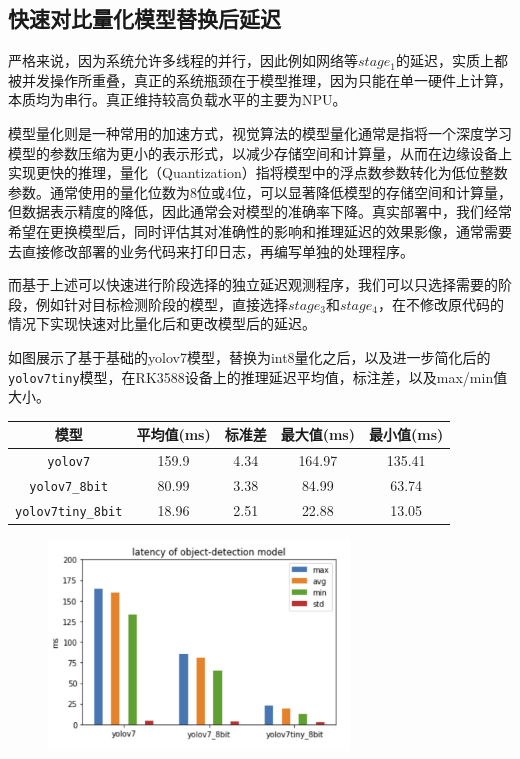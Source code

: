 \documentclass[master,anonymous]{shtthesis}
\begin{document}
\subsection{快速对比量化模型替换后延迟}
严格来说，因为系统允许多线程的并行，因此例如网络等$stage_1$的延迟，实质上都被并发操作所重叠，真正的系统瓶颈在于模型推理，因为只能在单一硬件上计算，本质均为串行。真正维持较高负载水平的主要为NPU。

模型量化则是一种常用的加速方式，视觉算法的模型量化通常是指将一个深度学习模型的参数压缩为更小的表示形式，以减少存储空间和计算量，从而在边缘设备上实现更快的推理，量化（Quantization）指将模型中的浮点数参数转化为低位整数参数。通常使用的量化位数为8位或4位，可以显著降低模型的存储空间和计算量，但数据表示精度的降低，因此通常会对模型的准确率下降。真实部署中，我们经常希望在更换模型后，同时评估其对准确性的影响和推理延迟的效果影像，通常需要去直接修改部署的业务代码来打印日志，再编写单独的处理程序。

而基于上述可以快速进行阶段选择的独立延迟观测程序，我们可以只选择需要的阶段，例如针对目标检测阶段的模型，直接选择$stage_3$和$stage_4$，在不修改原代码的情况下实现快速对比量化后和更改模型后的延迟。

如图展示了基于基础的yolov7模型，替换为int8量化之后，以及进一步简化后的\verb*|yolov7tiny|模型，在RK3588设备上的推理延迟平均值，标注差，以及max/min值大小。

\begin{table}[htbp]
	\centering
	\begin{tabular}{ccccc}
		\toprule
		模型  & 平均值(ms) & 标准差 & 最大值(ms) & 最小值(ms)\\
		\midrule
		\verb*|yolov7|          & 159.9 & 4.34 & 164.97 & 135.41  \\ 
		\verb*|yolov7_8bit|     & 80.99 & 3.38 & 84.99  & 63.74 \\ 
		\verb*|yolov7tiny_8bit| & 18.96  & 2.51 & 22.88 & 13.05\\ 
		\bottomrule
	\end{tabular}
\end{table}

\begin{figure}[htbp]
	\centering
	\includegraphics[width=8cm]{img/model.png}
	\label{对比模型推理延迟}
\end{figure}
\end{document}
